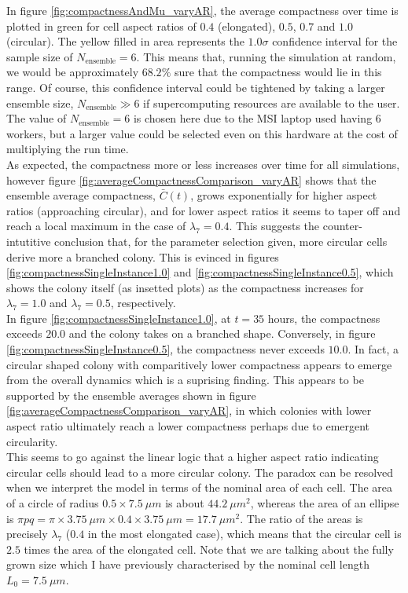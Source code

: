 In figure \ref{fig:compactnessAndMu_varyAR}, the average compactness over time 
is plotted in green for cell aspect ratios of $0.4$ (elongated), $0.5$, $0.7$ and $1.0$ (circular). 
The yellow filled in area represents the $1.0 \sigma$ confidence interval for the sample 
size of $N_{\textrm{ensemble}} = 6$. This means that, running the simulation at random,
we would be approximately $68.2 \%$ sure that the compactness would lie in this range.
Of course, this confidence interval could be tightened by 
taking a larger ensemble size, $N_{\textrm{ensemble}} \gg 6$ if supercomputing 
resources are available to the user. The value of $N_{\textrm{ensemble}} = 6$ is chosen 
here due to the MSI laptop used having $6$ workers, but a larger value could 
be selected even on this hardware at the cost of multiplying the run time.
\\

As expected, the compactness more or less increases over time for all simulations, 
however figure \ref{fig:averageCompactnessComparison_varyAR} shows that the ensemble average
compactness,
$\bar{C}(t)$, grows exponentially for higher aspect ratios (approaching circular), 
and for lower aspect ratios it seems to taper off and reach a local maximum 
in the case of $\lambda_7 = 0.4$. This suggests the counter-intutitive 
conclusion that, for the parameter selection given, more circular cells 
derive more a branched colony. This is 
evinced in figures \ref{fig:compactnessSingleInstance1.0} and 
\ref{fig:compactnessSingleInstance0.5}, which shows 
the colony itself (as insetted plots) as the compactness increases for 
$\lambda_7 = 1.0$ and $\lambda_7 = 0.5$, respectively. 
\\

In figure \ref{fig:compactnessSingleInstance1.0}, 
at $t = 35$ hours, the compactness exceeds $20.0$ and 
the colony takes on a branched shape. Conversely, in figure \ref{fig:compactnessSingleInstance0.5}, 
the compactness never exceeds $10.0$. In fact, 
a circular shaped colony with comparitively lower compactness appears 
to emerge from the overall dynamics which is a suprising finding. 
This appears to be supported by the ensemble averages shown in figure 
\ref{fig:averageCompactnessComparison_varyAR}, in which
colonies with lower aspect ratio ultimately
reach a lower compactness perhaps due to emergent circularity.
\\

This seems to go against the linear logic that a higher aspect ratio indicating circular cells 
should lead to a more circular colony. The paradox can be resolved 
when we interpret the model in terms of the nominal area of each cell. 
The area of a circle of radius $0.5 \times 7.5 \ \mu m$ is about $44.2 \ \mu m^2$,
whereas the area of an ellipse is $\pi pq = \pi \times 3.75 \ \mu m \times 0.4 \times 3.75 \ \mu m =
17.7 \ \mu m^2$. The ratio of the areas is precisely $\lambda_7$ ($0.4$ in the most elongated case), which 
means that the circular cell is $2.5$ times the area of the elongated cell.
Note that we are talking about the fully grown size which I have previously characterised
by the nominal cell length $L_0 = 7.5 \ \mu m$.
\\

